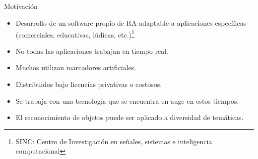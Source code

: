 \subsection*{}
\begin{frame}{Motivación}
  \begin{itemize}
  \item Desarrollo de un software propio de RA adaptable a aplicaciones específicas (comerciales, educativas, lúdicas, etc.)\footnote{SINC: Centro de Investigación en señales, sistemas e inteligencia computacional}
  \item No todas las aplicaciones trabajan en tiempo real.
  \item Muchos utilizan marcadores artificiales.
  \item Distribuidos bajo licencias privativas o costosos.
  \item Se trabaja con una tecnología que se encuentra en auge en estos tiempos.
  \item El reconocimiento de objetos puede ser aplicado a diversidad de temáticas.
  \end{itemize}
\end{frame}

